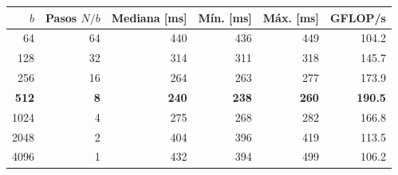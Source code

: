 \begin{tabular}{rrrrrr}
\toprule
$b$ & Pasos $N/b$ & Mediana [ms] & Mín. [ms] & Máx. [ms] & GFLOP/s \\
\midrule
64 & 64 & 440 & 436 & 449 & 104.2 \\
128 & 32 & 314 & 311 & 318 & 145.7 \\
256 & 16 & 264 & 263 & 277 & 173.9 \\
\textbf{512} & \textbf{8} & \textbf{240} & \textbf{238} & \textbf{260} & \textbf{190.5} \\
1024 & 4 & 275 & 268 & 282 & 166.8 \\
2048 & 2 & 404 & 396 & 419 & 113.5 \\
4096 & 1 & 432 & 394 & 499 & 106.2 \\
\bottomrule
\end{tabular}
